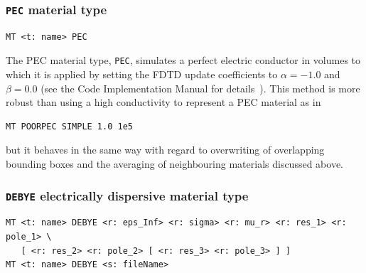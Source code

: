 \documentclass[onecolumn,a4paper]{article}
\numberwithin{equation}{section}
\begin{document}
\subsubsection{\texttt{PEC} material type}

\begin{verbatim}
MT <t: name> PEC
\end{verbatim}

The PEC material type, \texttt{PEC}, simulates a perfect electric conductor 
in volumes to which it is applied by setting the FDTD update coefficients to 
$\alpha=-1.0$ and $\beta=0.0$ (see the Code Implementation Manual for details~\cite{vultimp}). 
This method is more robust than using a high conductivity to represent a PEC material as in
\begin{verbatim}
MT POORPEC SIMPLE 1.0 1e5
\end{verbatim}
but it behaves in the same way with regard to overwriting of overlapping bounding boxes 
and the averaging of neighbouring materials discussed above.

\subsubsection{\texttt{DEBYE} electrically dispersive material type}

\begin{verbatim}
MT <t: name> DEBYE <r: eps_Inf> <r: sigma> <r: mu_r> <r: res_1> <r: pole_1> \
   [ <r: res_2> <r: pole_2> [ <r: res_3> <r: pole_3> ] ] 
MT <t: name> DEBYE <s: fileName>
\end{verbatim}
\end{document}
